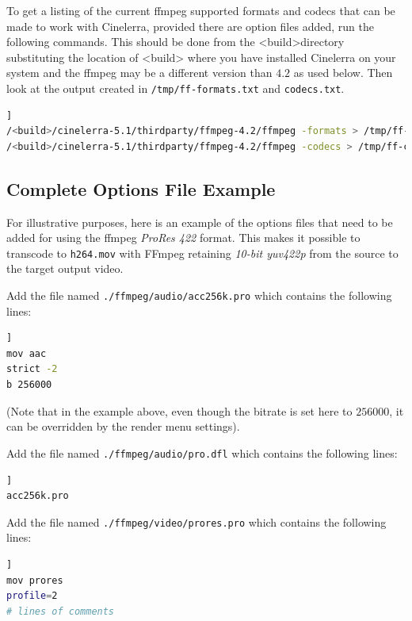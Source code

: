To get a listing of the current ffmpeg supported formats and codecs that can be made to work with Cinelerra, provided there are option files added, run the following commands.  This should be done from the <build>directory substituting the location of <build> where you have installed Cinelerra on your system and the ffmpeg may be a different version than $4.2$ as used below.  Then look at the output created in \texttt{/tmp/ff-formats.txt} and \texttt{codecs.txt}.

\begin{lstlisting}[language=bash,numbers=none]]
/<build>/cinelerra-5.1/thirdparty/ffmpeg-4.2/ffmpeg -formats > /tmp/ff-formats.txt
/<build>/cinelerra-5.1/thirdparty/ffmpeg-4.2/ffmpeg -codecs > /tmp/ff-codecs.txt
\end{lstlisting}

\subsection{Complete Options File Example}%
\label{sub:complete_options_file_example}

For illustrative purposes, here is an example of the options files that need to be added for using the ffmpeg \textit{ProRes 422} format. This makes it possible to transcode to \texttt{h264.mov} with FFmpeg retaining \textit{10-bit yuv422p} from the source to the target output video.

Add the file named  \texttt{./ffmpeg/audio/acc256k.pro} which contains the following lines:

\begin{lstlisting}[language=bash,numbers=none]]
mov aac
strict -2
b 256000
\end{lstlisting}

(Note that in the example above, even though the bitrate is set here to $256000$, it can be 	overridden by the render menu settings).

Add the file named \texttt{./ffmpeg/audio/pro.dfl} which contains the following lines:

\begin{lstlisting}[language=bash,numbers=none]]
acc256k.pro
\end{lstlisting}

Add the file named \texttt{./ffmpeg/video/prores.pro} which contains the following lines:

\begin{lstlisting}[language=bash,numbers=none]]
mov prores
profile=2
# lines of comments
\end{lstlisting}

